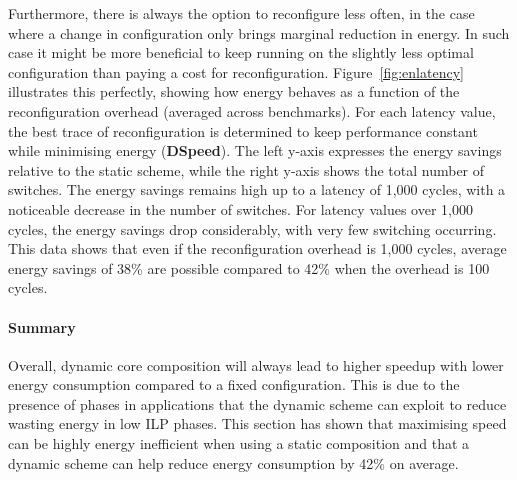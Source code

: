 Furthermore, there is always the option to reconfigure less often, in the case where a change in configuration only brings marginal reduction in energy.
In such case it might be more beneficial to keep running on the slightly less optimal configuration than paying a cost for reconfiguration.
Figure~\ref{fig:enlatency} illustrates this perfectly, showing how energy behaves as a function of the reconfiguration overhead (averaged across benchmarks).
For each latency value, the best trace of reconfiguration is determined to keep performance constant while minimising energy (\textbf{DSpeed}).
The left y-axis expresses the energy savings relative to the static scheme, while the right y-axis shows the total number of switches.
The energy savings remains high up to a latency of 1,000 cycles, with a noticeable decrease in the number of switches.
For latency values over 1,000 cycles, the energy savings drop considerably, with very few switching occurring.
This data shows that even if the reconfiguration overhead is 1,000 cycles, average energy savings of 38\% are possible compared to 42\% when the overhead is 100 cycles.

\paragraph*{Summary}

Overall, dynamic core composition will always lead to higher speedup with lower energy consumption compared to a fixed configuration.
This is due to the presence of phases in applications that the dynamic scheme can exploit to reduce wasting energy in low ILP phases.
This section has shown that maximising speed can be highly energy inefficient when using a static composition and that a dynamic scheme can help reduce energy consumption by 42\% on average.

